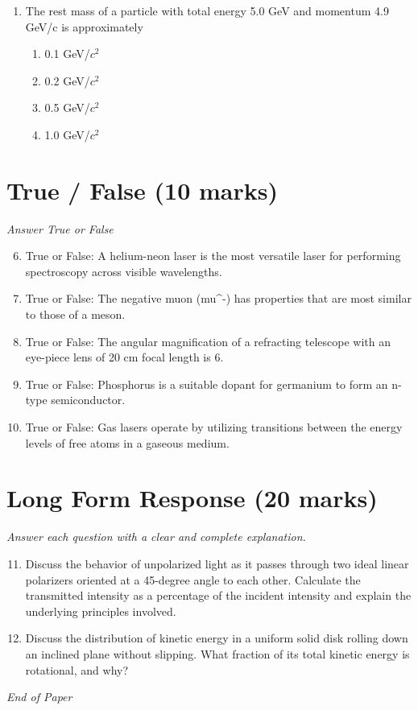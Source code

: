 \documentclass[12pt]{article}
\begin{document}
\begin{enumerate}[label=\arabic*.]
\begin{enumerate}[label=(\alph*)]
    \item Fermions have antisymmetric wave functions and obey the Pauli exclusion principle.
\end{enumerate}
\item The rest mass of a particle with total energy 5.0 GeV and momentum 4.9 GeV/c is approximately
\begin{enumerate}[label=(\alph*)]
    \item 0.1 GeV/$c^2$
    \item 0.2 GeV/$c^2$
    \item 0.5 GeV/$c^2$
    \item 1.0 GeV/$c^2$
\end{enumerate}
\end{enumerate}

\section*{True / False (10 marks)}
\textit{Answer True or False}
\begin{enumerate}[label=\arabic*.]
\setcounter{enumi}{5}
\item True or False: A helium-neon laser is the most versatile laser for performing spectroscopy across visible wavelengths.
\item True or False: The negative muon (mu^-) has properties that are most similar to those of a meson.
\item True or False: The angular magnification of a refracting telescope with an eye-piece lens of 20 cm focal length is 6.
\item True or False: Phosphorus is a suitable dopant for germanium to form an n-type semiconductor.
\item True or False: Gas lasers operate by utilizing transitions between the energy levels of free atoms in a gaseous medium.
\end{enumerate}

\section*{Long Form Response (20 marks)}
\textit{Answer each question with a clear and complete explanation.}
\begin{enumerate}[label=\arabic*.]
\setcounter{enumi}{10}
\item Discuss the behavior of unpolarized light as it passes through two ideal linear polarizers oriented at a 45-degree angle to each other. Calculate the transmitted intensity as a percentage of the incident intensity and explain the underlying principles involved.
\item Discuss the distribution of kinetic energy in a uniform solid disk rolling down an inclined plane without slipping. What fraction of its total kinetic energy is rotational, and why?
\end{enumerate}

\vfill
\noindent\textit{End of Paper}
\end{document}
